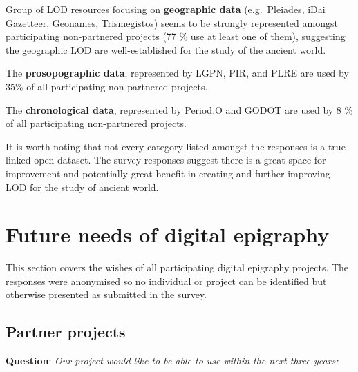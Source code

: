 \documentclass[
  12pt,
]{scrreprt}
\begin{document}
\footnotesize

\normalsize

Group of LOD resources focusing on \textbf{geographic data}
(e.g.~Pleiades, iDai Gazetteer, Geonames, Trismegistos) seems to be
strongly represented amongst participating non-partnered projects (77 \%
use at least one of them), suggesting the geographic LOD are
well-established for the study of the ancient world.

The \textbf{prosopographic data}, represented by LGPN, PIR, and PLRE are
used by 35\% of all participating non-partnered projects.

The \textbf{chronological data}, represented by Period.O and GODOT are
used by 8 \% of all participating non-partnered projects.

It is worth noting that not every category listed amongst the responses
is a true linked open dataset. The survey responses suggest there is a
great space for improvement and potentially great benefit in creating
and further improving LOD for the study of ancient world.

\hypertarget{future-needs-of-digital-epigraphy}{%
\chapter{Future needs of digital
epigraphy}\label{future-needs-of-digital-epigraphy}}

This section covers the wishes of all participating digital epigraphy
projects. The responses were anonymised so no individual or project can
be identified but otherwise presented as submitted in the survey.

\hypertarget{partner-projects}{%
\section{Partner projects}\label{partner-projects}}

\textbf{Question}: \emph{Our project would like to be able to use within
the next three years:}

\footnotesize
\end{document}
